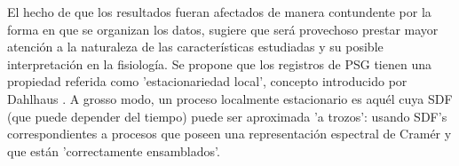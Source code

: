 \documentclass[12pt,a4paper]{mitthesis}
\newtheorem{defn}{Definici\'on}
\newcommand{\intPI}{\int_{-\pi}^{\pi}}
\newcommand{\Cov}[1]{\mathrm{Cov}\left( #1 \right)}
\newcommand{\abso}[1]{\left| #1 \right|}
\begin{document}
El hecho de que los resultados fueran afectados de manera contundente por la forma en que se 
organizan los datos, sugiere que ser\'a provechoso prestar mayor atenci\'on a la naturaleza de las 
caracter\'isticas estudiadas y su posible interpretaci\'on en la fisiolog\'ia.
Se propone que los registros de PSG tienen una propiedad referida como 'estacionariedad local',
concepto introducido por Dahlhaus \cite{Dahlhaus97}.
A grosso modo, un proceso localmente estacionario es aqu\'el cuya SDF (que puede depender del 
tiempo) puede ser aproximada 'a trozos': usando SDF's correspondientes a procesos que poseen una 
representaci\'on espectral de Cram\'er y que est\'an 'correctamente ensamblados'.

\end{document}
